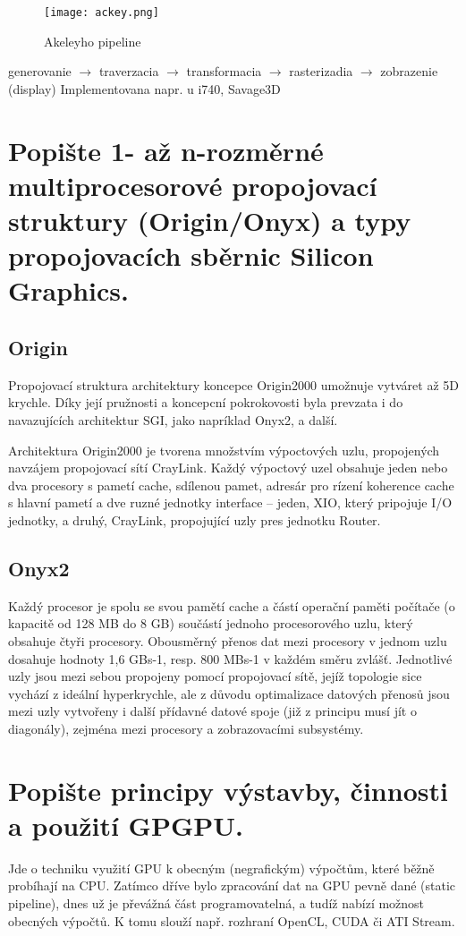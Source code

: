 	\begin{figure}[h!]
		\centering
		\texttt{[image: ackey.png]}
		\caption{Akeleyho pipeline}
		\label{fig:ackey}
	\end{figure}
	generovanie $\rightarrow$ traverzacia $\rightarrow$ transformacia $\rightarrow$ rasterizadia $\rightarrow$ zobrazenie (display) Implementovana napr. u i740, Savage3D


\section{Popište 1- až n-rozměrné multiprocesorové propojovací struktury (Origin/Onyx) a typy propojovacích sběrnic Silicon Graphics.}
	\subsection*{Origin}
		Propojovací struktura architektury koncepce Origin2000 umožnuje vytváret až 5D krychle. Díky její pružnosti a koncepcní pokrokovosti byla prevzata i do navazujících architektur SGI, jako napríklad Onyx2, a další.
		
		Architektura Origin2000 je tvorena množstvím výpoctových uzlu, propojených navzájem propojovací sítí CrayLink. Každý výpoctový uzel obsahuje jeden nebo dva procesory s pametí cache, sdílenou pamet, adresár pro rízení koherence cache s hlavní pametí a dve ruzné jednotky interface – jeden, XIO, který pripojuje I/O jednotky, a druhý, CrayLink, propojující uzly pres jednotku Router.

	\subsection*{Onyx2}
		Každý procesor je spolu se svou pamětí cache a částí operační paměti počítače (o kapacitě od 128 MB do 8 GB) součástí jednoho procesorového uzlu, který obsahuje čtyři procesory. Obousměrný přenos dat mezi procesory v jednom uzlu dosahuje hodnoty 1,6 GBs-1, resp. 800 MBs-1 v každém směru zvlášť. Jednotlivé uzly jsou mezi sebou propojeny pomocí propojovací sítě, jejíž topologie sice vychází z ideální hyperkrychle, ale z důvodu optimalizace datových přenosů jsou mezi uzly vytvořeny i další přídavné datové spoje (již z principu musí jít o diagonály), zejména mezi procesory a zobrazovacími subsystémy.
	

\section{Popište principy výstavby, činnosti a použití GPGPU.}
	Jde o techniku využití GPU k obecným (negrafickým) výpočtům, které běžně probíhají na CPU. Zatímco dříve bylo zpracování dat na GPU pevně dané (static pipeline), dnes už je převážná část programovatelná, a tudíž nabízí možnost obecných výpočtů. K tomu slouží např. rozhraní OpenCL, CUDA či ATI Stream.
	
